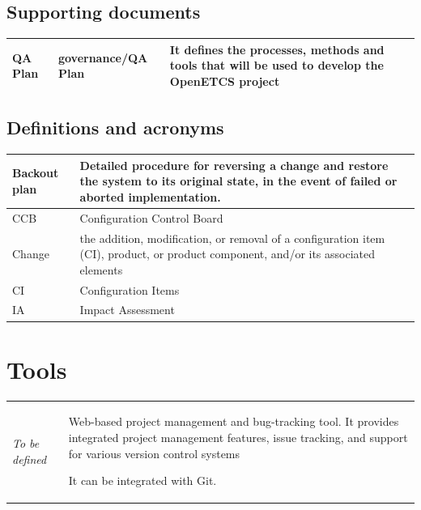 \documentclass{template/openetcs_article}
\begin{document}
\subsection{Supporting documents}
\tablehead{}
\tabletail{}
\tablelasttail{}
\begin{supertabular}{|m{3cm}m{3,5cm}m{7,5cm}|}
\hline
QA Plan & governance/QA Plan & It defines the processes, methods and tools that will be used to develop the OpenETCS project
\\\hline
\end{supertabular}

\subsection{Definitions and acronyms}
\tablehead{}
\tabletail{}
\tablelasttail{}
\begin{supertabular}{|m{3cm}m{11cm}|}
\hline
Backout plan &
Detailed procedure for reversing a change and restore the system to its original state, in the event of failed or aborted implementation.\\\hline
CCB &
Configuration Control Board
\\\hline
Change &
the addition, modification, or removal of a configuration item (CI), product, or product component, and/or its associated elements
\\\hline
CI &
Configuration Items
\\\hline
IA &
Impact Assessment
\\\hline
\end{supertabular}

\section{Tools}

\begin{flushleft}

\begin{tabular}{|m{3cm}|m{11cm}|}
\hline
\rowcolor{myblue}
\multicolumn{2}{|c|}{Tools} \\\hline
\it{To be defined} &
Web-based project management and bug-tracking tool. It provides integrated project management features, issue tracking, and support for various version control systems

It can be integrated with Git.
\\\hline
\end{tabular}
\end{flushleft}
\end{document}
